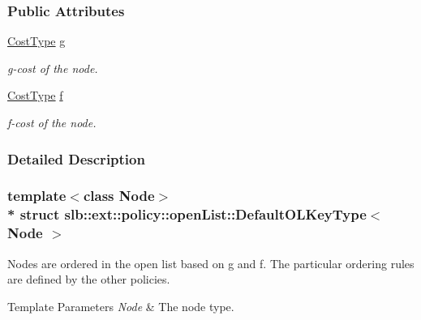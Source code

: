 \subsubsection*{Public Attributes}
\begin{DoxyCompactItemize}
\item 
\hyperlink{structslb_1_1ext_1_1policy_1_1openList_1_1DefaultOLKeyType_afdae8b0b1b4427bc68c40ecd960cf1ab}{Cost\+Type} \hyperlink{structslb_1_1ext_1_1policy_1_1openList_1_1DefaultOLKeyType_a89a082636c1559e23c33651906b9a73b}{g}\hypertarget{structslb_1_1ext_1_1policy_1_1openList_1_1DefaultOLKeyType_a89a082636c1559e23c33651906b9a73b}{}\label{structslb_1_1ext_1_1policy_1_1openList_1_1DefaultOLKeyType_a89a082636c1559e23c33651906b9a73b}

\begin{DoxyCompactList}\small\item\em g-\/cost of the node. \end{DoxyCompactList}\item 
\hyperlink{structslb_1_1ext_1_1policy_1_1openList_1_1DefaultOLKeyType_afdae8b0b1b4427bc68c40ecd960cf1ab}{Cost\+Type} \hyperlink{structslb_1_1ext_1_1policy_1_1openList_1_1DefaultOLKeyType_a5ed8cd631d87833d34fccc76880df2e3}{f}\hypertarget{structslb_1_1ext_1_1policy_1_1openList_1_1DefaultOLKeyType_a5ed8cd631d87833d34fccc76880df2e3}{}\label{structslb_1_1ext_1_1policy_1_1openList_1_1DefaultOLKeyType_a5ed8cd631d87833d34fccc76880df2e3}

\begin{DoxyCompactList}\small\item\em f-\/cost of the node. \end{DoxyCompactList}\end{DoxyCompactItemize}


\subsubsection{Detailed Description}
\subsubsection*{template$<$class Node$>$\\*
struct slb\+::ext\+::policy\+::open\+List\+::\+Default\+O\+L\+Key\+Type$<$ Node $>$}

Nodes are ordered in the open list based on g and f. The particular ordering rules are defined by the other policies. 


\begin{DoxyTemplParams}{Template Parameters}
{\em Node} & The node type. \\
\hline
\end{DoxyTemplParams}


